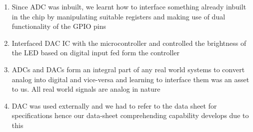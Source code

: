 \documentclass[12pt, letterpaper]{article}
\begin{document}
\begin{enumerate}
	\item Since ADC was inbuilt, we learnt how to interface something already inbuilt in the chip by manipulating suitable registers and making use of dual functionality of the GPIO pins
	
	\item Interfaced DAC IC with the microcontroller and controlled the brightness of the LED based on digital input fed form the controller 
	
	\item ADCs and DACs form an integral part of any real world systems to convert analog into digital and vice-versa and learning to interface them was an asset to us. All real world signals are analog in nature
	
	\item DAC was used externally and we had to refer to the data sheet for specifications hence our data-sheet comprehending capability develops due to this
\end{enumerate}
\end{document}
